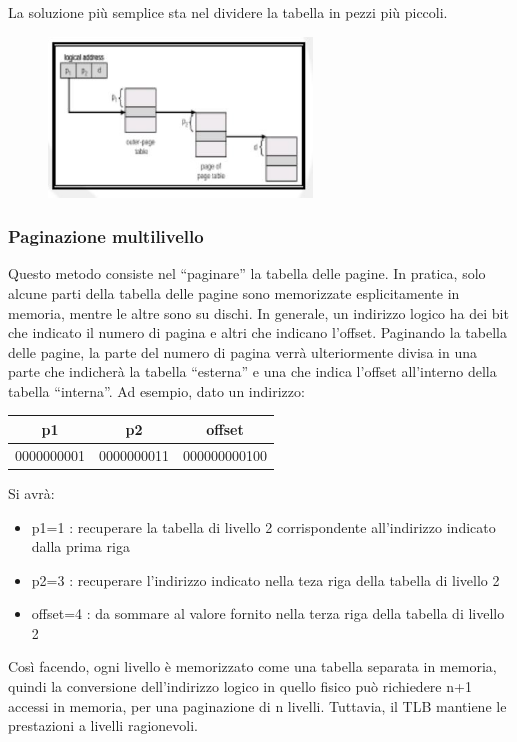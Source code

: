 \documentclass[a4paper]{article}
\begin{document}
La soluzione più semplice sta nel dividere la tabella in pezzi più piccoli.

\begin{figure}
   \includegraphics[width=7cm]{img/pagpag.JPG}
\end{figure}
\subsubsection{Paginazione multilivello}
Questo metodo consiste nel ``paginare'' la tabella delle pagine. In pratica, solo alcune parti della tabella delle pagine sono memorizzate esplicitamente in memoria, mentre le altre sono su dischi. In generale, un indirizzo logico ha dei bit che indicato il numero di pagina e altri che indicano l'offset. Paginando la tabella delle pagine, la parte del numero di pagina verrà ulteriormente divisa in una parte che indicherà la tabella ``esterna'' e una che indica l'offset all'interno della tabella ``interna''.
Ad esempio, dato un indirizzo: \newline
\begin{table}[htb]
   \centering
   \begin{tabular}{ccc}
      p1                               & p2                              & offset                            \\ \hline
      \multicolumn{1}{|c|}{0000000001} & \multicolumn{1}{c|}{0000000011} & \multicolumn{1}{c|}{000000000100} \\ \hline
   \end{tabular}
\end{table} \newline
Si avrà:
\begin{itemize}
   \item p1=1 : recuperare la tabella di livello 2 corrispondente all'indirizzo indicato dalla prima riga
   \item p2=3 : recuperare l'indirizzo indicato nella teza riga della tabella di livello 2
   \item offset=4 : da sommare al valore fornito nella terza riga della tabella di livello 2
\end{itemize}
Così facendo, ogni livello è memorizzato come una tabella separata in memoria, quindi la conversione dell'indirizzo logico in quello fisico può richiedere n+1 accessi in memoria, per una paginazione di n livelli. Tuttavia, il TLB mantiene le prestazioni a livelli ragionevoli.
\end{document}
